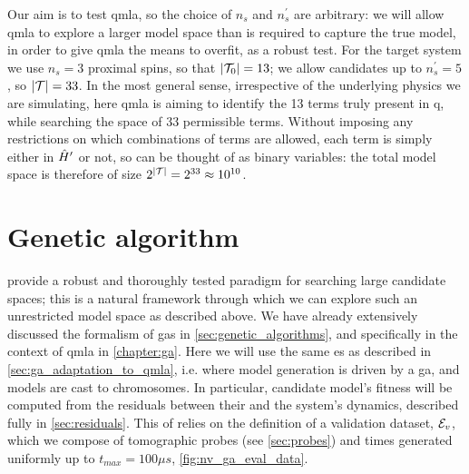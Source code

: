 \par 

Our aim is to test \gls{qmla}, so the choice of $n_s$ and $n_s^{\prime}$ are arbitrary:
    we will allow \gls{qmla} to explore a larger \gls{model space} than is required to 
    capture the \gls{true model}, in order to give \gls{qmla} the means to overfit, as a robust test. 
For the target system we use $n_s=3$ proximal spins, 
    so that  $\left\lvert \mathcal{T}_0 \right\rvert = 13$;
    we allow candidates up to $n_s^{\prime}=5$, 
    so $\left\lvert \mathcal{T} \right\rvert = 33$. 
In the most general sense, irrespective of the underlying physics we are simulating, 
    here \gls{qmla} is aiming to identify the 13 terms truly present in \gls{q}, 
    while searching the space of 33 permissible terms. 
Without imposing any restrictions on which combinations of terms are allowed, 
    each term is simply either in $\hat{H}^{\prime}$ or not, so can be thought of as binary variables:
    the total \gls{model space} is therefore of size $2^{\left\lvert \mathcal{T} \right\rvert}=2^{33} \approx 10^{10}$. 

\section{Genetic algorithm}
 provide a robust and thoroughly tested paradigm for searching large candidate spaces; 
    this is a natural framework through which we can explore such an unrestricted model space 
    as described above. 
We have already extensively discussed the formalism of \glspl{ga} in \cref{sec:genetic_algorithms}, 
    and specifically in the context of \gls{qmla} in \cref{chapter:ga}.
Here we will use the same \gls{es} as described in \cref{sec:ga_adaptation_to_qmla}, 
    i.e. where model generation is driven by a \gls{ga}, 
    and models are cast to \glspl{chromosome}. 
In particular, candidate model's fitness will be computed from the residuals
    between their and the system's dynamics, described fully in \cref{sec:residuals}. 
This \acrfull{of} relies on the definition of a validation dataset, ${ \mathcal{E} }_v$,
    which we compose of tomographic \glspl{probe} (see \cref{sec:probes}) 
    and times generated uniformly up to 
    $t_{max} = 100 \mu s$, \cref{fig:nv_ga_eval_data}. 

